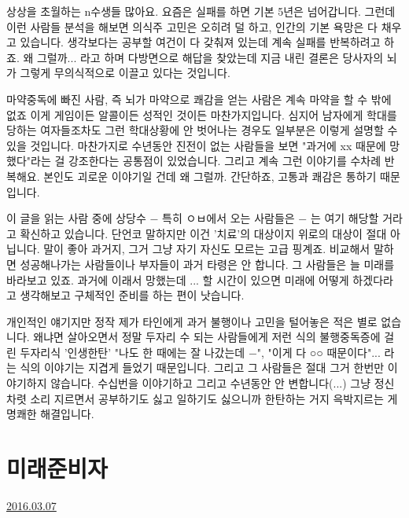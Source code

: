 상상을 초월하는 n수생들 많아요. 요즘은 실패를 하면 기본 5년은 넘어갑니다.
그런데 이런 사람들 분석을 해보면 의식주 고민은 오히려 덜 하고, 인간의 기본 욕망은 다 채우고 있습니다.
생각보다는 공부할 여건이 다 갖춰져 있는데 계속 실패를 반복하려고 하죠.
왜 그럴까... 라고 하며 다방면으로 해답을 찾았는데
지금 내린 결론은 당사자의 뇌가 그렇게 무의식적으로 이끌고 있다는 것입니다.
\vspace{5mm}

마약중독에 빠진 사람, 즉 뇌가 마약으로 쾌감을 얻는 사람은 계속 마약을 할 수 밖에 없죠
이게 게임이든 알콜이든 성적인 것이든 마찬가지입니다.
심지어 남자에게 학대를 당하는 여자들조차도 그런 학대상황에 안 벗어나는 경우도 일부분은 이렇게 설명할 수 있을 것입니다.
마찬가지로 수년동안 진전이 없는 사람들을 보면 "과거에 xx 때문에 망했다"라는 걸 강조한다는 공통점이 있었습니다.
그리고 계속 그런 이야기를 수차례 반복해요. 본인도 괴로운 이야기일 건데 왜 그럴까.
간단하죠, 고통과 쾌감은 통하기 때문입니다.
\vspace{5mm}

이 글을 읽는 사람 중에 상당수 $-$ 특히 ㅇㅂ에서 오는 사람들은 $-$ 는 여기 해당할 거라고 확신하고 있습니다.
단언코 말하지만 이건 '치료'의 대상이지 위로의 대상이 절대 아닙니다. 말이 좋아 과거지, 그거 그냥 자기 자신도 모르는 고급 핑계죠.
비교해서 말하면 성공해나가는 사람들이나 부자들이 과거 타령은 안 합니다. 그 사람들은 늘 미래를 바라보고 있죠.
과거에 이래서 망했는데 ... 할 시간이 있으면 미래에 어떻게 하겠다라고 생각해보고 구체적인 준비를 하는 편이 낫습니다.
\vspace{5mm}

개인적인 얘기지만 정작 제가 타인에게 과거 불행이나 고민을 털어놓은 적은 별로 없습니다.
왜냐면 살아오면서 정말 두자리 수 되는 사람들에게 저런 식의 불행중독증에 걸린 두자리식 '인생한탄'
"나도 한 때에는 잘 나갔는데 $-$", "이게 다 ○○ 때문이다"... 라는 식의 이야기는 지겹게 들었기 때문입니다.
그리고 그 사람들은 절대 그거 한번만 이야기하지 않습니다. 수십번을 이야기하고 그리고 수년동안 안 변합니다(...)
그냥 정신차렷 소리 지르면서 공부하기도 싫고 일하기도 싫으니까 한탄하는 거지 윽박지르는 게 명쾌한 해결입니다.
\vspace{5mm}










\section{미래준비자}
\href{https://www.kockoc.com/Apoc/666823}{2016.03.07}

